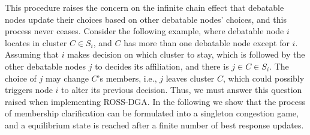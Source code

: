 \documentclass[journal,comsoc]{IEEEtran}
\theoremstyle{mytheoremstyle}
\theoremstyle{mytheoremstyle}
\theoremstyle{mytheoremstyle}
\newcommand{\ie}{i.e., }
\begin{document}
This procedure raises the concern on the infinite chain effect that debatable nodes update their choices based on other debatable nodes' choices, and this process never ceases.
Consider the following example, where debatable node $i$ locates in cluster $C\in S_i$, and $C$ has more than one debatable node except for $i$.
Assuming that $i$ makes decision on which cluster to stay, which is followed by the other debatable nodes $j$ to decides its affiliation, and there is $j\in C\in S_i$.
The choice of $j$ may change $C$'s members, \ie $j$ leaves cluster $C$, which could possibly triggers node $i$ to alter its previous decision.
Thus, we must answer this question raised when implementing ROSS-DGA.
In the following we show that the process of membership clarification can be formulated into a singleton congestion game, and a equilibrium state is reached after a finite number of best response updates.
\end{document}
